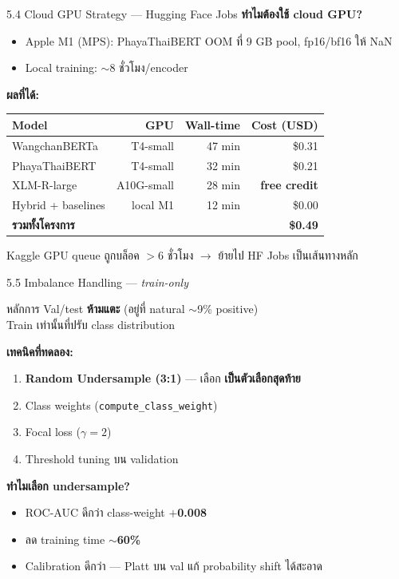 \documentclass[aspectratio=169,11pt,xcolor=dvipsnames]{beamer}
\newcommand{\hl}[1]{\textcolor{kmitlOrange}{\textbf{#1}}}
\begin{document}
\begin{frame}[shrink=20]{5.4 Cloud GPU Strategy — Hugging Face Jobs}
  \textbf{ทำไมต้องใช้ cloud GPU?}
  \begin{itemize}
    \item Apple M1 (MPS): PhayaThaiBERT OOM ที่ 9 GB pool, fp16/bf16 ให้ NaN
    \item Local training: $\sim$8 ชั่วโมง/encoder
  \end{itemize}
  \vspace{0.4em}
  \textbf{ผลที่ได้:}
  \begin{center}
    \begin{tabular}{lrrr}
      \toprule
      \textbf{Model} & \textbf{GPU} & \textbf{Wall-time} & \textbf{Cost (USD)}\\
      \midrule
      WangchanBERTa & T4-small  & 47 min & \$0.31\\
      PhayaThaiBERT & T4-small  & 32 min & \$0.21\\
      XLM-R-large   & A10G-small & 28 min & \hl{free credit}\\
      Hybrid + baselines & local M1 & 12 min & \$0.00\\
      \midrule
      \textbf{รวมทั้งโครงการ} & & & \hl{\$0.49}\\
      \bottomrule
    \end{tabular}
  \end{center}
  \vspace{0.4em}
  \begin{center}
    \scriptsize Kaggle GPU queue ถูกบล็อค $>$6 ชั่วโมง $\rightarrow$ ย้ายไป HF Jobs เป็นเส้นทางหลัก
  \end{center}
\end{frame}

\begin{frame}[shrink=5]{5.5 Imbalance Handling — \emph{train-only}}
  \begin{block}{หลักการ}
    Val/test \hl{ห้ามแตะ} (อยู่ที่ natural $\sim$9\% positive)\\
    Train เท่านั้นที่ปรับ class distribution
  \end{block}

  \textbf{เทคนิคที่ทดลอง:}
  \begin{enumerate}
    \item \textbf{Random Undersample (3:1)} — เลือก \hl{เป็นตัวเลือกสุดท้าย}
    \item Class weights (\texttt{compute\_class\_weight})
    \item Focal loss ($\gamma = 2$)
    \item Threshold tuning บน validation
  \end{enumerate}

  \textbf{ทำไมเลือก undersample?}
  \begin{itemize}
    \item ROC-AUC ดีกว่า class-weight \hl{$+$0.008}
    \item ลด training time \hl{$\sim$60\%}
    \item Calibration ดีกว่า — Platt บน val แก้ probability shift ได้สะอาด
  \end{itemize}
\end{frame}
\end{document}
